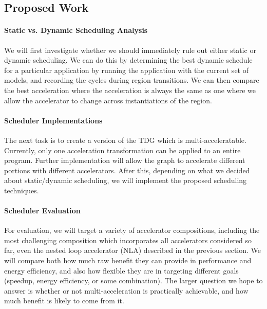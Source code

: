 \subsection{Proposed Work}

\paragraph{Static vs. Dynamic Scheduling Analysis}
We will first investigate whether we should
immediately rule out either static or dynamic scheduling.  We can do this by
determining the best dynamic schedule for a particular application by running
the application with the current set of models, and recording the cycles during
region transitions.  We can then compare the best acceleration where the
acceleration is always the same as one where we allow the accelerator to
change across instantiations of the region. 
 
\paragraph{Scheduler Implementations}
The next task is to create a version of the TDG which is multi-acceleratable.
Currently, only one acceleration transformation can be applied to an entire
program.  Further implementation will allow the graph to accelerate
different portions with different accelerators.  After this, depending on what we
decided about static/dynamic scheduling, we will implement the proposed scheduling
techniques.

\paragraph{Scheduler Evaluation}
For evaluation, we will target a variety of accelerator compositions, including
the most challenging composition which incorporates all accelerators considered
so far, even the nested loop accelerator (NLA) described in the previous section.
We will compare both how much raw benefit they can provide in
performance and energy efficiency, and also how flexible they are in targeting
different goals (speedup, energy efficiency, or some combination).  The larger
question we hope to answer is whether or not multi-acceleration is
practically achievable, and how much benefit is likely to come from it.

%
%


